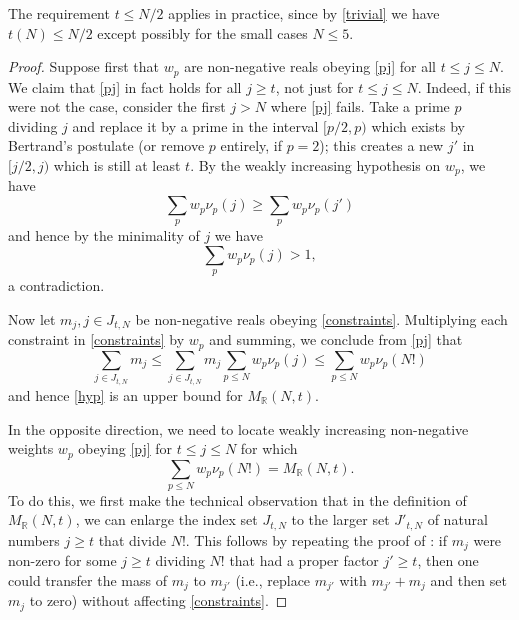 \documentclass[10pt,a4paper,reqno]{amsart}
\numberwithin{equation}{section}
\theoremstyle{plain}
\theoremstyle{definition}
\newcommand\R{\mathbb{R}}
\begin{document}
The requirement $t \leq N/2$ applies in practice, since by \eqref{trivial} we have $t(N) \leq N/2$ except possibly for the small cases $N \leq 5$.

\begin{proof}  Suppose first that $w_p$ are non-negative reals obeying \eqref{pj} for all $t \leq j \leq N$.
We claim that \eqref{pj} in fact holds for all $j \geq t$, not just for $t \leq j \leq N$.  Indeed, if this were not the case, consider the first $j > N$ where \eqref{pj} fails.  Take a prime $p$ dividing $j$ and replace it by a prime in the interval $[p/2,p)$ which exists by Bertrand's postulate (or remove $p$ entirely, if $p=2$); this creates a new $j'$ in $[j/2,j)$ which is still at least $t$.  By the weakly increasing hypothesis on $w_p$, we have
  $$ \sum_p w_p \nu_p(j) \geq \sum_p w_p \nu_p(j')$$
  and hence by the minimality of $j$ we have
  $$ \sum_p w_p \nu_p(j) > 1,$$
  a contradiction.

Now let $m_j, j \in J_{t,N}$ be non-negative reals obeying \eqref{constraints}.  Multiplying each constraint in \eqref{constraints} by $w_p$ and summing, we conclude from \eqref{pj} that
$$ \sum_{j \in J_{t,N}} m_j  \leq \sum_{j \in J_{t,N}} m_j \sum_{p \leq N} w_p \nu_p(j) \leq \sum_{p \leq N} w_p \nu_p(N!)$$
and hence \eqref{hyp} is an upper bound for $M_\R(N,t)$.

In the opposite direction, we need to locate weakly increasing non-negative weights $w_p$ obeying \eqref{pj} for $t \leq j \leq N$ for which
\begin{equation}\label{wpm} 
  \sum_{p \leq N} w_p \nu_p(N!) = M_\R(N,t).
\end{equation}
To do this, we first make the technical observation that in the definition of $M_\R(N,t)$, we can enlarge the index set $J_{t,N}$ to the larger set $J'_{t,N}$ of natural numbers $j \geq t$ that divide $N!$.  This follows by repeating the proof of : if $m_j$ were non-zero for some $j \geq t$ dividing $N!$ that had a proper factor $j' \geq t$, then one could transfer the mass of $m_j$ to $m_{j'}$ (i.e., replace $m_{j'}$ with $m_{j'}+m_j$ and then set $m_j$ to zero) without affecting \eqref{constraints}.  


\end{proof}
\end{document}
